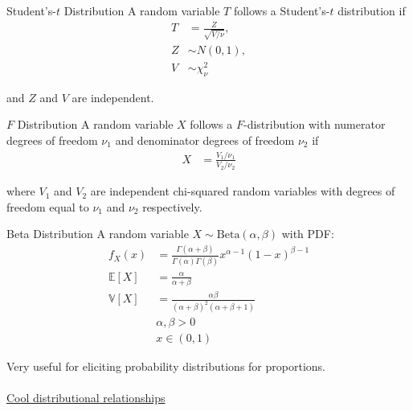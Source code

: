 \documentclass{beamer}
\begin{document}
\begin{frame}{Student's-$t$ Distribution}
A random variable $T$ follows a Student's-$t$ distribution if
\begin{align*}
T & = \frac{Z}{\sqrt{V/\nu}},\\
Z &\sim N(0, 1),\\
V &\sim \chi^2_{\nu}
\end{align*} 

and $Z$ and $V$ are independent.
\end{frame}

\begin{frame}{$F$ Distribution}
A random variable $X$ follows a $F$-distribution with numerator degrees of freedom $\nu_1$ and denominator degrees of freedom $\nu_2$ if
\begin{align*}
X &= \frac{V_1 / \nu_1}{V_2 / \nu_2}
\end{align*} 

where $V_1$ and $V_2$ are independent chi-squared random variables with degrees of freedom equal to $\nu_1$ and $\nu_2$ respectively.
\end{frame}

\begin{frame}{Beta Distribution}
A random variable $X\sim\mathrm{Beta}(\alpha, \beta)$ with PDF:
\begin{align*}
f_{X}(x) &= \frac{\Gamma(\alpha + \beta)}{\Gamma(\alpha)\Gamma(\beta)}x^{\alpha-1}(1-x)^{\beta - 1} \\
\mathbb{E}[X] &= \frac{\alpha}{\alpha + \beta} \\
\mathbb{V}[X] &= \frac{\alpha \beta}{(\alpha + \beta)^{2}(\alpha + \beta + 1)} \\
&\alpha, \beta > 0 \\
&x \in (0, 1)
\end{align*} 

Very useful for eliciting probability distributions for proportions.\\~\\

\href{https://en.wikipedia.org/wiki/Relationships_among_probability_distributions}{Cool distributional relationships}
\end{frame}
\end{document}
